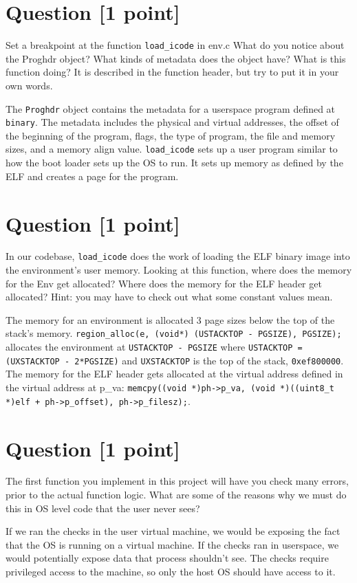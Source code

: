 \documentclass[11pt]{article}
\begin{document}
\section{Question [1 point]}

Set a breakpoint at the function \texttt{load\_icode\(\)} in env.c What do you notice about the Proghdr object? What kinds of metadata does the object have? What is this function doing? It is described in the function header, but try to put it in your own words.

\begin{solution}
The  \texttt{Proghdr} object contains the metadata for a userspace program defined at  \texttt{binary}. The metadata includes the physical and virtual addresses, the offset of the beginning of the program, flags, the type of program, the file and memory sizes, and a memory align value. \texttt{load\_icode\(\)} sets up a user program similar to how the boot loader sets up the OS to run. It sets up memory as defined by the ELF and creates a page for the program.
\end{solution}


\section{Question [1 point]}

In our codebase, \texttt{load\_icode\(\)} does the work of loading the ELF binary image into the environment's user memory. Looking at this function, where does the memory for the Env get allocated? Where does the memory for the ELF header get allocated? Hint: you may have to check out what some constant values mean.

\begin{solution}
The memory for an environment is allocated 3 page sizes below the top of the stack's memory. \texttt{region\_alloc(e, (void*) (USTACKTOP - PGSIZE), PGSIZE);}  allocates the environment at  \texttt{USTACKTOP - PGSIZE} where  \texttt{USTACKTOP = (UXSTACKTOP - 2*PGSIZE)} and  \texttt{UXSTACKTOP} is the top of the stack, \texttt{0xef800000}. The memory for the ELF header gets allocated at the virtual address defined in the virtual address at p\_va: \texttt{memcpy((void *)ph->p\_va, (void *)((uint8\_t *)elf + ph->p\_offset), ph->p\_filesz);}.
\end{solution}


\section{Question [1 point]}

The first function you implement in this project will have you check many errors, prior to the actual function logic. What are some of the reasons why we must do this in OS level code that the user never sees?

\begin{solution}
If we ran the checks in the user virtual machine, we would be exposing the fact that the OS is running on a virtual machine. If the checks ran in userspace, we would potentially expose data that process shouldn't see. The checks require privileged access to the machine, so only the host OS should have access to it.
\end{solution}
\end{document}
